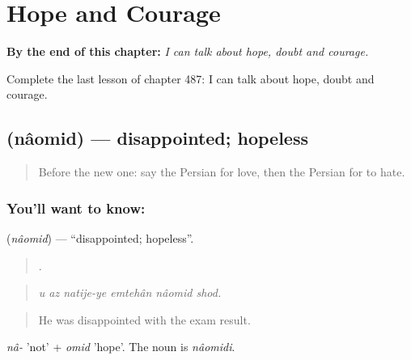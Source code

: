 
\chapter{Hope and Courage}
\label{ch:fa-hope-and-courage}

\begin{chapteropening}
\textbf{By the end of this chapter:} \emph{I can talk about hope, doubt and courage.}

Complete the last lesson of chapter 487: I can talk about hope, doubt and courage.
\end{chapteropening}

\section[\texorpdfstring{\fa{ناامید} (nâomid)}{ناامید (nâomid)}]{ (nâomid) — disappointed; hopeless}

\label{lesson:FA-C487-naomid}



\begin{quote}
Before the new one: say the Persian for love, then the Persian for to hate.
\end{quote}

\subsection*{You'll want to know: }
\textbf{} (\emph{nâomid}) — \textquotedblleft{}disappointed; hopeless\textquotedblright{}.

\begin{quote}
     .
\end{quote}

\begin{quote}
\emph{u az natije-ye emtehân nâomid shod.}
\end{quote}

\begin{quote}
He was disappointed with the exam result.
\end{quote}

\emph{nâ-} 'not' + \emph{omid} 'hope'. The noun is \emph{nâomidi}.


